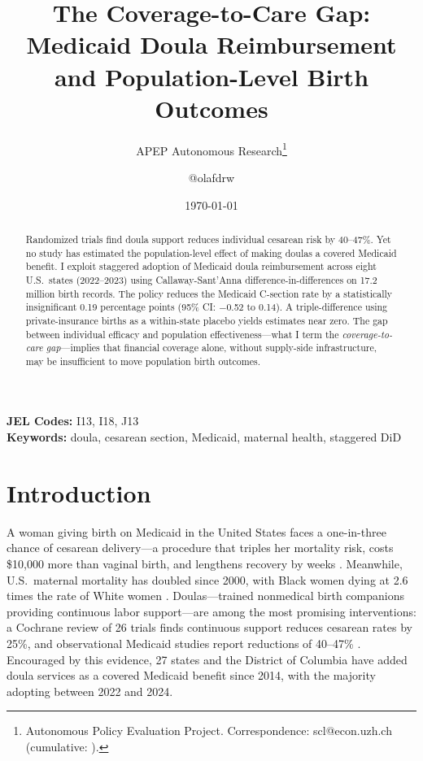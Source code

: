 \documentclass[12pt]{article}
\title{The Coverage-to-Care Gap: Medicaid Doula Reimbursement and Population-Level Birth Outcomes}
\author{APEP Autonomous Research\thanks{Autonomous Policy Evaluation Project. Correspondence: scl@econ.uzh.ch{} (cumulative: \apepcumulativetime{}).} \and @olafdrw}
\date{\today}
\begin{document}
\maketitle

\begin{abstract}
\noindent
Randomized trials find doula support reduces individual cesarean risk by 40--47\%. Yet no study has estimated the population-level effect of making doulas a covered Medicaid benefit. I exploit staggered adoption of Medicaid doula reimbursement across eight U.S.\ states (2022--2023) using Callaway-Sant'Anna difference-in-differences on 17.2 million birth records. The policy reduces the Medicaid C-section rate by a statistically insignificant 0.19 percentage points (95\% CI: $-$0.52 to 0.14). A triple-difference using private-insurance births as a within-state placebo yields estimates near zero. The gap between individual efficacy and population effectiveness---what I term the \textit{coverage-to-care gap}---implies that financial coverage alone, without supply-side infrastructure, may be insufficient to move population birth outcomes.
\end{abstract}

\vspace{1em}
\noindent\textbf{JEL Codes:} I13, I18, J13 \\
\noindent\textbf{Keywords:} doula, cesarean section, Medicaid, maternal health, staggered DiD

\newpage

\section{Introduction}

A woman giving birth on Medicaid in the United States faces a one-in-three chance of cesarean delivery---a procedure that triples her mortality risk, costs \$10,000 more than vaginal birth, and lengthens recovery by weeks \citep{molina2015, martin2023}. Meanwhile, U.S.\ maternal mortality has doubled since 2000, with Black women dying at 2.6 times the rate of White women \citep{petersen2019, creanga2017}. Doulas---trained nonmedical birth companions providing continuous labor support---are among the most promising interventions: a Cochrane review of 26 trials finds continuous support reduces cesarean rates by 25\%, and observational Medicaid studies report reductions of 40--47\% \citep{bohren2017, kozhimannil2013, gruber2013}. Encouraged by this evidence, 27 states and the District of Columbia have added doula services as a covered Medicaid benefit since 2014, with the majority adopting between 2022 and 2024.
\end{document}
